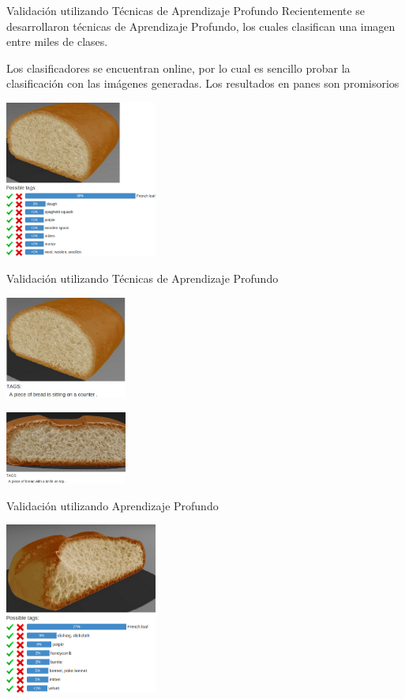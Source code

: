 \documentclass[spanish,unknownkeysallowed]{beamer}
\begin{document}
\begin{frame}{Validación utilizando Técnicas de Aprendizaje Profundo}
Recientemente se desarrollaron técnicas de Aprendizaje Profundo, los cuales clasifican una imagen entre miles de clases.

Los clasificadores se encuentran online, por lo cual es sencillo probar la clasificación con las imágenes generadas. Los resultados en panes son promisorios

\centerline{\includegraphics[width=5cm]{../figures/deep1}}

\end{frame}

\begin{frame}{Validación utilizando Técnicas de Aprendizaje Profundo}

\centerline{\includegraphics[width=4cm]{../figures/deep2}}
\centerline{\includegraphics[width=4cm]{../figures/deep3}}
\end{frame}
\begin{frame}{Validación utilizando Aprendizaje Profundo}
\centerline{\includegraphics[width=5cm]{../figures/deep4}}

\end{frame}
\end{document}
